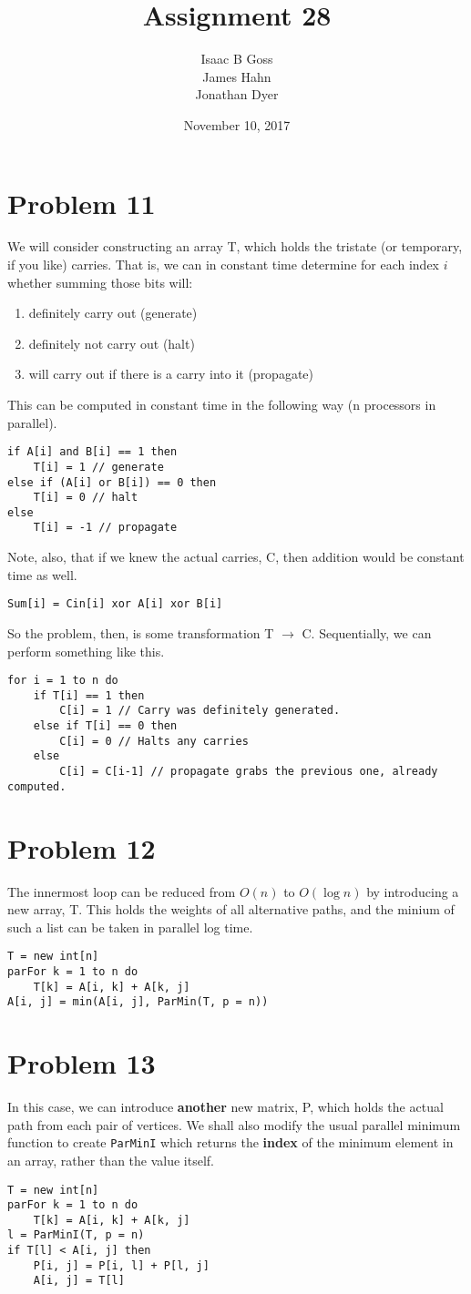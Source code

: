 \documentclass{article}
\author{Isaac B Goss\\ James Hahn\\ Jonathan Dyer}
\date{November 10, 2017}
\title{Assignment 28}
\providecommand{\prob}[1]{\section*{Problem #1}}
\providecommand{\tightlist}{
    \setlength{\itemsep}{0pt}\setlength{\parskip}{0pt}
}
\begin{document}
\maketitle
    \prob{11}
    We will consider constructing an array T, which holds the tristate (or temporary, if you like) carries.
    That is, we can in constant time determine for each index $i$ whether summing those bits will:
    \begin{enumerate}\tightlist
        \item definitely carry out (generate)
        \item definitely not carry out (halt)
        \item will carry out if there is a carry into it (propagate)
    \end{enumerate}
    This can be computed in constant time in the following way (n processors in parallel).
    \begin{lstlisting}
if A[i] and B[i] == 1 then
    T[i] = 1 // generate
else if (A[i] or B[i]) == 0 then
    T[i] = 0 // halt
else
    T[i] = -1 // propagate
    \end{lstlisting}
    Note, also, that if we knew the actual carries, C, then addition would be constant time as well.
    \begin{lstlisting}
Sum[i] = Cin[i] xor A[i] xor B[i]
    \end{lstlisting}

    So the problem, then, is some transformation T $\to$ C.
    Sequentially, we can perform something like this.
    \begin{lstlisting}
for i = 1 to n do
    if T[i] == 1 then
        C[i] = 1 // Carry was definitely generated.
    else if T[i] == 0 then
        C[i] = 0 // Halts any carries
    else
        C[i] = C[i-1] // propagate grabs the previous one, already computed.
    \end{lstlisting}

    \pagebreak
    \prob{12}
        The innermost loop can be reduced from $O(n)$ to $O(\log n)$ by introducing a new array, T.
        This holds the weights of all alternative paths, and the minium of such a list can be taken in parallel log time.
        \begin{lstlisting}
T = new int[n]
parFor k = 1 to n do
    T[k] = A[i, k] + A[k, j]
A[i, j] = min(A[i, j], ParMin(T, p = n))
        \end{lstlisting}
    
    \prob{13}
        In this case, we can introduce \textbf{another} new matrix, P, which holds the actual path from each pair of vertices.
        We shall also modify the usual parallel minimum function to create \texttt{ParMinI} which returns the \textbf{index} of the minimum element in an array, rather than the value itself.
        \begin{lstlisting}
T = new int[n]
parFor k = 1 to n do
    T[k] = A[i, k] + A[k, j]
l = ParMinI(T, p = n)
if T[l] < A[i, j] then
    P[i, j] = P[i, l] + P[l, j]
    A[i, j] = T[l]
        \end{lstlisting}
\end{document}
